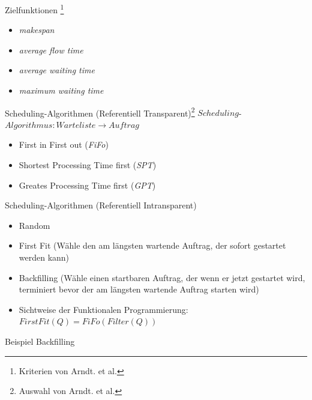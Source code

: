 \documentclass[aspectratio=169,10pt]{beamer}
\begin{document}
\begin{frame}[t,fragile]{Zielfunktionen \footnote{Kriterien von Arndt. et al.}}
\begin{itemize}[<+->]
	\item \emph{makespan}
	\item \emph{average flow time}
	\item \emph{average waiting time} 	
	\item \emph{maximum waiting time}
\end{itemize}
\end{frame}

\begin{frame}[t, fragile]{Scheduling-Algorithmen (Referentiell Transparent)\footnote{Auswahl von Arndt. et al.}} 
$Scheduling$-$Algorithmus : Warteliste \rightarrow Auftrag$\\
\pause

\begin{itemize}[<+->]
	\item First in First out (\emph{FiFo})
	\item Shortest Processing Time first (\emph{SPT})
	\item Greates Processing Time first (\emph{GPT})
\end{itemize}
\end{frame}





\begin{frame}[t, fragile]{Scheduling-Algorithmen (Referentiell Intransparent)}
\begin{itemize}[<+->]
	\item Random
	\item \alert{First Fit} (W\"ahle den am l\"angsten wartende Auftrag, der sofort gestartet werden kann)
	\item \alert{Backfilling} (W\"ahle einen startbaren Auftrag, der wenn er jetzt gestartet wird, terminiert bevor der am l\"angsten wartende Auftrag starten wird)
	\item \alert{Sichtweise der Funktionalen Programmierung}: $FirstFit(Q) = FiFo ( Filter (Q))$
\end{itemize}
\end{frame}

\begin{frame}[t, fragile]{Beispiel Backfilling}
\end{frame}

\end{document}
